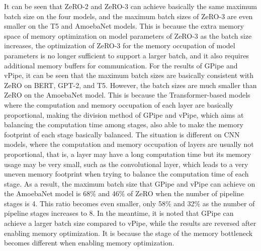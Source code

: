 It can be seen that ZeRO-2 and ZeRO-3 can achieve basically
the same maximum batch size on the four models,
and the maximum batch sizes of ZeRO-3 are even smaller on the T5 and AmoebaNet models.
This is because the extra memory space of memory optimization on model parameters of ZeRO-3
as the batch size increases,
the optimization of ZeRO-3 for the memory occupation of model parameters is no longer
sufficient to support a larger batch,
and it also requires additional memory buffers for communication.
For the results of GPipe and vPipe, it can be seen that the maximum batch sizes are basically
consistent with ZeRO on BERT, GPT-2, and T5.
However, the batch sizes are much smaller than ZeRO on the AmoebaNet model.
This is because the Transformer-based models where the computation
and memory occupation of each layer are basically proportional,
making the division method of GPipe and vPipe,
which aims at balancing the computation time among stages,
also able to make the memory footprint of each stage basically balanced.
The situation is different on CNN models, where the computation
and memory occupation of layers are usually not proportional, that is,
a layer may have a long computation time but its memory usage may be very small,
such as the convolutional layer, which leads to a very uneven memory footprint
when trying to balance the computation time of each stage.
As a result, the maximum batch size that GPipe and vPipe can achieve
on the AmoebaNet model is 68\% and 46\% of ZeRO when the number of pipeline stages is 4.
This ratio becomes even smaller, only 58\% and 32\% as the number of pipeline stages increases to 8.
In the meantime, it is noted that GPipe can achieve a larger batch size compared to vPipe,
while the results are reversed after enabling memory optimization.
It is because the stage of the memory bottleneck becomes different when enabling memory optimization.

